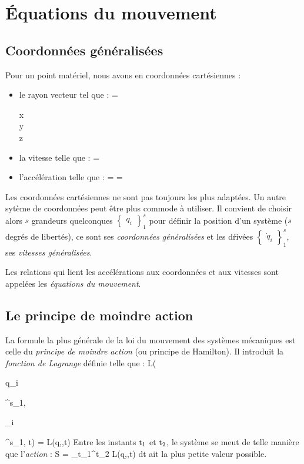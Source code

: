 \chapter{\'Equations du mouvement}
\section{Coordonn\'ees g\'en\'eralis\'ees}

Pour un point mat\'eriel, nous avons en coordonn\'ees cart\'esiennes :
\begin{itemize}
\item le rayon vecteur tel que :
	\be
		 = \begin{pmatrix} x \\ y \\ z \end{pmatrix}
	\ee
\item la vitesse telle que :
	\be
		 = 
	\ee
\item l'acc\'el\'eration telle que :
	\be
		 =  = 
	\ee
\end{itemize}

Les coordonn\'ees cart\'esiennes ne sont pas toujours les plus adapt\'ees. Un autre syt\`eme de coordonn\'ees peut \^etre plus commode \`a utiliser. Il convient de choisir alors $s$ grandeurs quelconques $\begin{Bmatrix}q_{i}\end{Bmatrix}^{s}_{1}$ pour d\'efinir la position d'un syst\`eme ($s$ degr\'es de libert\'es), ce sont ses \emph{coordonn\'ees g\'en\'eralis\'ees} et les d\'riv\'ees $\begin{Bmatrix}\dot{q}_{i}\end{Bmatrix}^{s}_{1}$, ses \emph{vitesses g\'en\'eralis\'ees}.

Les relations qui lient les acc\'el\'erations aux coordonn\'ees et aux vitesses sont appel\'ees les \emph{\'equations du mouvement}.

\section{Le principe de moindre action}

La formule la plus g\'en\'erale de la loi du mouvement des syst\`emes mécaniques est celle du \emph{principe de moindre action} (ou principe de Hamilton). Il introduit la \emph{fonction de Lagrange} d\'efinie telle que :
\be
	L(\begin{Bmatrix}q_{i}\end{Bmatrix}^{s}_{1},\begin{Bmatrix}_{i}\end{Bmatrix}^{s}_{1}, {\rm t}) = L(q,,{\rm t})
\ee
Entre les instants ${\rm t}_{1}$ et ${\rm t}_{2}$, le système se meut de telle mani\`ere que l'\emph{action} :
\be
	S = \int_{{\rm t}_{1}}^{{\rm t}_{2}} L(q,,{\rm t}) d{\rm t} \label{EQ:2_1}
\ee
ait la plus petite valeur possible.

